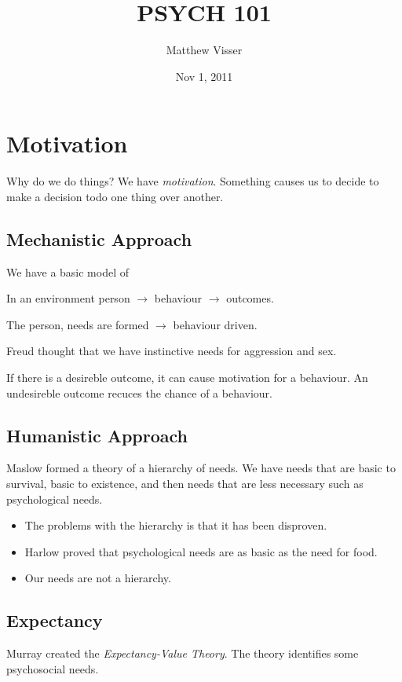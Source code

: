 \documentclass[12pt]{article}
\begin{document}
\title{PSYCH 101}
\author{Matthew Visser}
\date{Nov  1, 2011}
\maketitle

\section{Motivation}

Why do we do things?  We have \emph{motivation}. Something causes us to decide
to make a decision todo one thing over another.

\subsection{Mechanistic Approach}

We have a basic model of 

In an environment person $\to$ behaviour $\to$ outcomes.

The person, needs are formed $\to$ behaviour driven.

Freud thought that we have instinctive needs for aggression and sex.

If there is a desireble outcome, it can cause motivation for a behaviour.  An
undesireble outcome recuces the chance of a behaviour.

\subsection{Humanistic Approach}

Maslow formed a theory of a hierarchy of needs. We have needs that are basic to
survival, basic to existence, and then needs that are less necessary such as
psychological needs.

\begin{itemize}
	\item The problems with the hierarchy is that it has been disproven.
	\item Harlow proved that psychological needs are as basic as the need for
		food.
	\item Our needs are not a hierarchy.
\end{itemize}

\subsection{Expectancy}

Murray created the \emph{Expectancy-Value Theory}. The theory identifies some
psychosocial needs.
\end{document}
